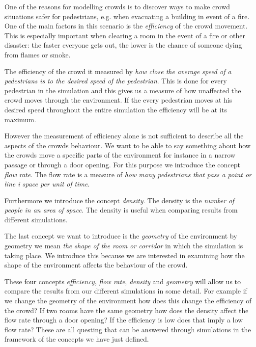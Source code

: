 One of the reasons for modelling crowds is to discover ways to make crowd 
situations safer for pedestrians, e.g. when evacuating a building in event of 
a fire. One of the main factors in this scenario is the \emph{efficiency} of 
the crowd movement. This is especially important when clearing a room in the 
event of a fire or other disaster: the faster everyone gets out, the lower is 
the chance of someone dying from flames or smoke.

The efficiency of the crowd it measured by \emph{how close the average speed 
of a pedestrians is to the desired speed of the pedestrian}. This is done for 
every pedestrian in the simulation and this gives us a measure of how unaffected 
the crowd moves through the environment. If the every pedestrian moves at his 
desired speed throughout the entire simulation the efficiency will be at its 
maximum.

However the measurement of efficiency alone is not sufficient to describe all 
the aspects of the crowds behaviour. We want to be able to say something about 
how the crowds move a specific parts of the environment for instance in a 
narrow passage or through a door opening. For this purpose we introduce the 
concept \emph{flow rate}. The flow rate is a measure of \emph{how many pedestrians 
that pass a point or line i space per unit of time}.

Furthermore we introduce the concept \emph{density}. The density is the \emph{number 
of people in an area of space}. The density is useful when comparing results from 
different simulations. 

The last concept we want to introduce is the \emph{geometry} of the environment 
by geometry we mean \emph{the shape of the room or corridor} in which the simulation 
is taking place. We introduce this because we are interested in examining how 
the shape of the environment affects the behaviour of the crowd.

These four concepts \emph{efficiency}, \emph{flow rate}, \emph{density} and 
\emph{geometry} will allow us to compare the results from our different simulations 
in some detail. For example if we change the geometry of the environment how does 
this change the efficiency of the crowd? If two rooms have the same geometry 
how does the density affect the flow rate through a door opening? If the efficiency 
is low does that imply a low flow rate? These are all questing that can be answered 
through simulations in the framework of the concepts we have just defined.    

